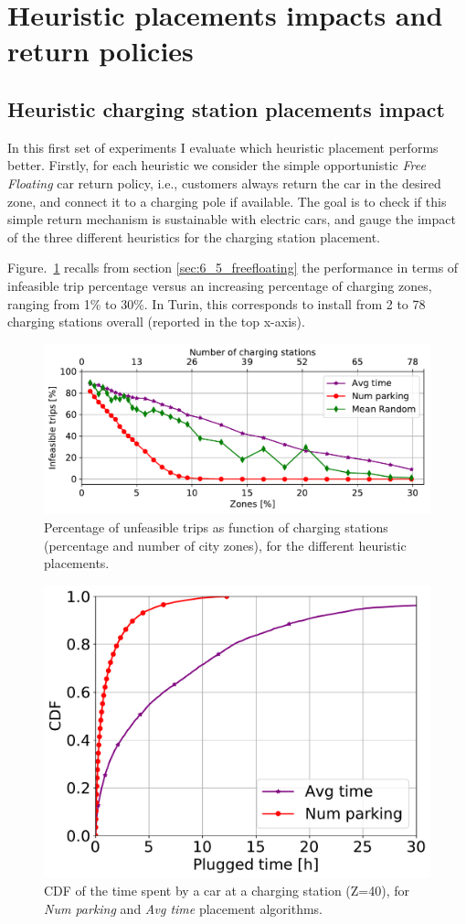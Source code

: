 \section{Heuristic placements impacts and return policies}
\label{sec:7_6_heurstic_placement}

\subsection{Heuristic charging station placements impact}

In this first set of experiments I evaluate which heuristic placement performs better.
Firstly, for each heuristic we consider the simple opportunistic \textit{Free Floating} car return policy, i.e., customers always return the car in the desired zone, and connect it to a charging pole if available. The goal is to check if this simple return mechanism is sustainable with electric cars, and gauge the impact of the three different heuristics for the charging station placement.
 
Figure.~\ref{fig:7_6_deathsVsZones_algorithm} recalls from section \ref{sec:6_5_freefloating} the performance in terms of infeasible trip percentage versus an increasing percentage of charging zones, ranging from  1\% to 30\%. In Turin, this corresponds to install from 2 to 78 charging stations overall (reported in the top x-axis). 

\begin{figure}[ht]
	\centering
	\includegraphics[width=0.9\columnwidth]{figures/Torino_FF_deaths_probs.pdf}
	\caption{Percentage of unfeasible trips as function of charging stations (percentage and number of city zones), for the different heuristic placements.}
	\label{fig:7_6_deathsVsZones_algorithm}
\end{figure}

\begin{figure}[ht]
	\centering
	\includegraphics[width=0.5\columnwidth]{figures/CDF_parking_time_per_algorithm.pdf}
	\caption{CDF of the time spent by a car at a charging station (Z=40), for \textit{Num parking} and \textit{Avg time} placement algorithms. }
		\label{fig:7_6_CDF_parking_time_per_algorithm}
\end{figure}

